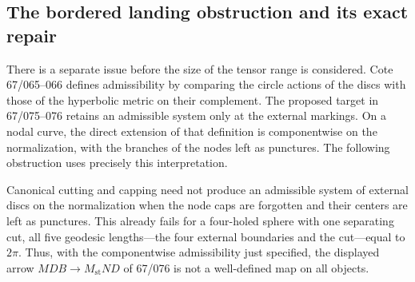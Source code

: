 \subsection{The bordered landing obstruction and its exact repair}
\label{sec:A1-bordered}

There is a separate issue before the size of the tensor range is
considered. Cote 67/065--066 defines admissibility by comparing the
circle actions of the discs with those of the hyperbolic metric on
their complement. The proposed target in 67/075--076 retains an
admissible system only at the external markings. On a nodal curve,
the direct extension of that definition is componentwise on the
normalization, with the branches of the nodes left as punctures.
The following obstruction uses precisely this interpretation.

\begin{proposition}
\label{A1-bordered-landing}
Canonical cutting and capping need not produce an admissible system
of external discs on the normalization when the node caps are
forgotten and their centers are left as punctures. This already
fails for a four-holed sphere with one separating cut, all five
geodesic lengths---the four external boundaries and the cut---equal
to $2\pi$. Thus, with the componentwise admissibility just specified,
the displayed arrow $MDB\longrightarrow M_{\mathrm{st}}ND$ of
67/076 is not a well-defined map on all objects.
\end{proposition}
